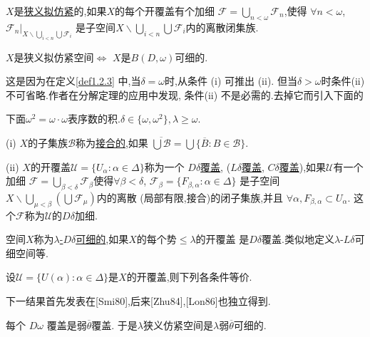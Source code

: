 \documentclass[main.tex]{subfiles}
\begin{document}
\begin{definition}
	$X$是\underline{狭义拟仿紧}的,如果$X$的每个开覆盖有个加细
	$\mathscr{F}=\bigcup_{n<\omega}\mathscr{F}_n$,使得
	$\forall n < \omega$, $\mathscr{F}_n|_{X\backslash\bigcup_{i<n}\bigcup\mathscr{F}_i}$
	是子空间$X\backslash\bigcup_{i<n}\bigcup\mathscr{F}_i$内的离散闭集族.
\end{definition}

\begin{fact}
	$X$是狭义拟仿紧空间$\Leftrightarrow$ $X$是$B(D,\omega)$可细的.
\end{fact}

这是因为在定义\ref{def1.2.3} 中,当$\delta=\omega$时,从条件 (i) 可推出 (ii).
但当$\delta>\omega$时条件(ii) 不可省略.作者在分解定理的应用中发现,
条件(ii) 不是必需的.去掉它而引入下面的

\begin{definition}
	下面$\omega^2=\omega\cdot\omega$表序数的积.$\delta\in\{\omega,\omega^2\}, \lambda\ge\omega$.
	
	\textnormal{(i)} $X$的子集族$\mathscr{B}$称为\underline{接合的},如果
	$\overline{\bigcup\mathscr{B}}=\bigcup\{\overline{B}: B\in\mathscr{B}\}$.
	
	\textnormal{(ii)} $X$的开覆盖$\mathscr{U}=\{U_\alpha:\alpha\in\Delta\}$称为一个
	\underline{$D\delta$覆盖}, \textnormal{(}\underline{$L\delta$覆盖}, 
	\underline{$C\delta$覆盖}\textnormal{)},如果$\mathscr{U}$有一个加细
   $\mathscr{F}=\bigcup_{\beta<\delta}\mathscr{F}_\beta$使得$\forall\beta<\delta$,
   $\mathscr{F}_\beta=\{F_{\beta,\alpha}: \alpha\in\Delta\}$
   是子空间$X\backslash\bigcup_{\mu<\beta}(\bigcup\mathscr{F}_\mu)$内的离散
   \textnormal{(}局部有限,接合\textnormal{)}的闭子集族,并且
   	$\forall\alpha, F_{\beta,\alpha}\subset U_\alpha$.
   	这个$\mathscr{F}$称为$\mathscr{U}$的$D\delta$加细.
   	
   	空间$X$称为\underline{$\lambda$-$D\delta$可细的},如果$X$的每个势$\le\lambda$的开覆盖
   	是$D\delta$覆盖.类似地定义$\lambda$-$L\delta$可细空间等.
\end{definition}

\begin{proposition}
	设$\mathscr{U}=\{U(\alpha): \alpha\in\Delta\}$是$X$的开覆盖,则下列各条件等价.
\end{proposition}


下一结果首先发表在[Smi80],后来[Zhu84],[Lon86]也独立得到.

\begin{theorem}
	每个 $D\omega$ 覆盖是弱$\overline{\theta}$覆盖.
	于是$\lambda$狭义仿紧空间是$\lambda$弱$\overline{\theta}$可细的.
\end{theorem}
\end{document}
